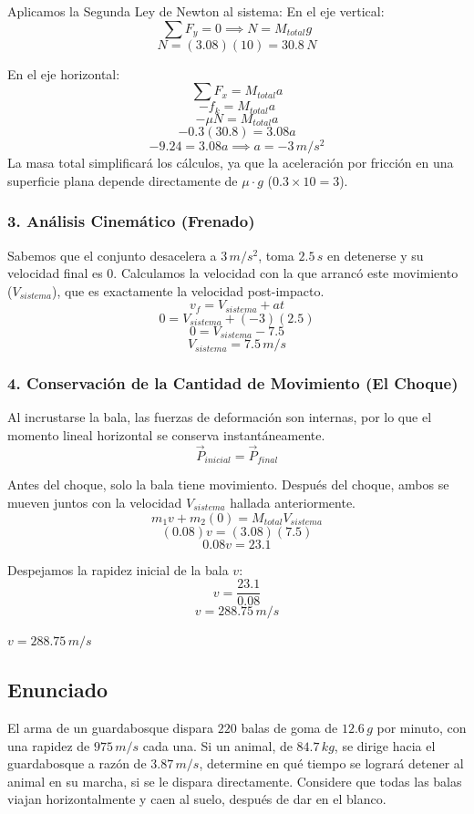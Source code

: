 \documentclass[12pt, a4paper]{article}
\begin{document}
Aplicamos la Segunda Ley de Newton al sistema:
En el eje vertical:
\[ \sum F_y = 0 \implies N = M_{total} g \]
\[ N = (3.08)(10) = 30.8 \, \si{N} \]

En el eje horizontal:
\[ \sum F_x = M_{total} a \]
\[ -f_k = M_{total} a \]
\[ -\mu N = M_{total} a \]
\[ -0.3 (30.8) = 3.08 a \]
\[ -9.24 = 3.08 a \implies a = -3 \, \si{m/s^2} \]
La masa total simplificará los cálculos, ya que la aceleración por fricción en una superficie plana depende directamente de $\mu \cdot g$ ($0.3 \times 10 = 3$).

\subsubsection*{3. Análisis Cinemático (Frenado)}
Sabemos que el conjunto desacelera a $3 \, \si{m/s^2}$, toma $2.5 \, \si{s}$ en detenerse y su velocidad final es $0$. Calculamos la velocidad con la que arrancó este movimiento ($V_{sistema}$), que es exactamente la velocidad post-impacto.
\[ v_f = V_{sistema} + a t \]
\[ 0 = V_{sistema} + (-3)(2.5) \]
\[ 0 = V_{sistema} - 7.5 \]
\[ V_{sistema} = 7.5 \, \si{m/s} \]

\subsubsection*{4. Conservación de la Cantidad de Movimiento (El Choque)}
Al incrustarse la bala, las fuerzas de deformación son internas, por lo que el momento lineal horizontal se conserva instantáneamente.
\[ \vec{P}_{inicial} = \vec{P}_{final} \]

Antes del choque, solo la bala tiene movimiento. Después del choque, ambos se mueven juntos con la velocidad $V_{sistema}$ hallada anteriormente.
\[ m_1 v + m_2 (0) = M_{total} V_{sistema} \]
\[ (0.08) v = (3.08)(7.5) \]
\[ 0.08 v = 23.1 \]

Despejamos la rapidez inicial de la bala $v$:
\[ v = \frac{23.1}{0.08} \]
\[ v = 288.75 \, \si{m/s} \]

\begin{tcolorbox}[colback=green!5!white, colframe=green!50!black, title=Respuesta Final]
\centering \Large $v = 288.75 \, \si{m/s}$
\end{tcolorbox}

\newpage

\subsection*{Enunciado}
El arma de un guardabosque dispara $220$ balas de goma de $12.6 \, \si{g}$ por minuto, con una rapidez de $975 \, \si{m/s}$ cada una. Si un animal, de $84.7 \, \si{kg}$, se dirige hacia el guardabosque a razón de $3.87 \, \si{m/s}$, determine en qué tiempo se logrará detener al animal en su marcha, si se le dispara directamente. Considere que todas las balas viajan horizontalmente y caen al suelo, después de dar en el blanco.
\end{document}
